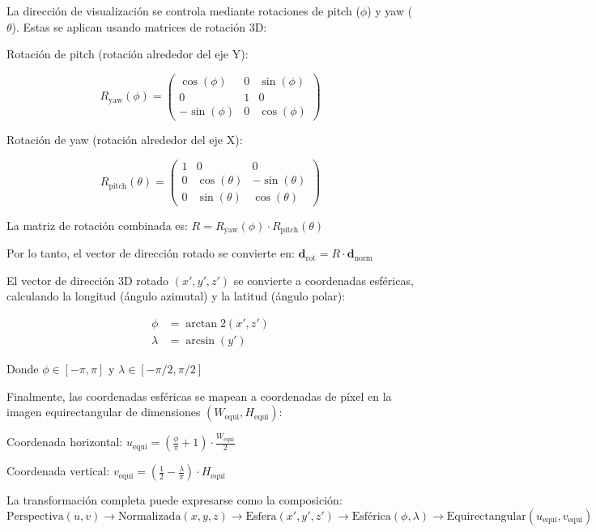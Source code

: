 La dirección de visualización se controla mediante rotaciones de pitch ($\phi$) y yaw ($\theta$). Estas se aplican usando matrices de rotación 3D:

Rotación de pitch (rotación alrededor del eje Y):

$$R_{\text{yaw}}(\phi) = \begin{pmatrix}
\cos(\phi) & 0 & \sin(\phi) \\
0 & 1 & 0 \\
-\sin(\phi) & 0 & \cos(\phi)
\end{pmatrix}$$

Rotación de yaw (rotación alrededor del eje X):

$$R_{\text{pitch}}(\theta) = \begin{pmatrix}
1 & 0 & 0 \\
0 & \cos(\theta) & -\sin(\theta) \\
0 & \sin(\theta) & \cos(\theta)
\end{pmatrix}$$

La matriz de rotación combinada es:
$R = R_{\text{yaw}}(\phi) \cdot R_{\text{pitch}}(\theta)$

Por lo tanto, el vector de dirección rotado se convierte en:
$\mathbf{d}_{\text{rot}} = R \cdot \mathbf{d}_{\text{norm}}$


El vector de dirección 3D rotado $(x', y', z')$ se convierte a coordenadas esféricas, calculando la longitud (ángulo azimutal) y la latitud (ángulo polar):


\begin{align}
\phi &= \arctan2(x', z')\\
\lambda &= \arcsin(y')
\end{align}

Donde $\phi \in [-\pi, \pi]$ y $\lambda \in [-\pi/2, \pi/2]$

Finalmente, las coordenadas esféricas se mapean a coordenadas de píxel en la imagen equirectangular de dimensiones $(W_{\text{equi}}, H_{\text{equi}})$:

Coordenada horizontal:
$u_{\text{equi}} = \left(\frac{\phi}{\pi} + 1\right) \cdot \frac{W_{\text{equi}}}{2}$

Coordenada vertical:
$v_{\text{equi}} = \left(\frac{1}{2} - \frac{\lambda}{\pi}\right) \cdot H_{\text{equi}}$

La transformación completa puede expresarse como la composición:
$\text{Perspectiva}(u,v) \rightarrow \text{Normalizada}(x,y,z) \rightarrow \text{Esfera}(x',y',z') \rightarrow \text{Esférica}(\phi,\lambda) \rightarrow \text{Equirectangular}(u_{\text{equi}},v_{\text{equi}})$


